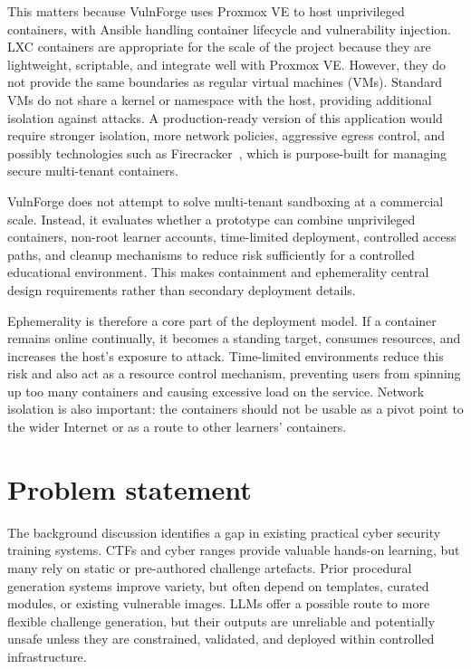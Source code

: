This matters because VulnForge uses Proxmox VE to host unprivileged containers, with Ansible handling container lifecycle and vulnerability injection. LXC containers are appropriate for the scale of the project because they are lightweight, scriptable, and integrate well with Proxmox VE. However, they do not provide the same boundaries as regular virtual machines (VMs). Standard VMs do not share a kernel or namespace with the host, providing additional isolation against attacks. A production-ready version of this application would require stronger isolation, more network policies, aggressive egress control, and possibly technologies such as Firecracker~\citep{noauthor_firecracker_nodate}, which is purpose-built for managing secure multi-tenant containers.

VulnForge does not attempt to solve multi-tenant sandboxing at a commercial scale. Instead, it evaluates whether a prototype can combine unprivileged containers, non-root learner accounts, time-limited deployment, controlled access paths, and cleanup mechanisms to reduce risk sufficiently for a controlled educational environment. This makes containment and ephemerality central design requirements rather than secondary deployment details.

Ephemerality is therefore a core part of the deployment model. If a container remains online continually, it becomes a standing target, consumes resources, and increases the host's exposure to attack. Time-limited environments reduce this risk and also act as a resource control mechanism, preventing users from spinning up too many containers and causing excessive load on the service. Network isolation is also important: the containers should not be usable as a pivot point to the wider Internet or as a route to other learners' containers.

\section{Problem statement}\label{sec:problem}

The background discussion identifies a gap in existing practical cyber security training systems. CTFs and cyber ranges provide valuable hands-on learning, but many rely on static or pre-authored challenge artefacts. Prior procedural generation systems improve variety, but often depend on templates, curated modules, or existing vulnerable images. LLMs offer a possible route to more flexible challenge generation, but their outputs are unreliable and potentially unsafe unless they are constrained, validated, and deployed within controlled infrastructure.

